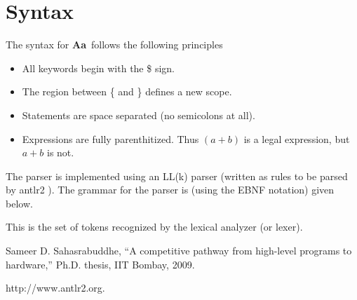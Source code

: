 \documentclass{article}
\newcommand{\Aa}{{\bf Aa}~}
\begin{document}
\section{Syntax} \label{sec:Syntax}

The syntax for \Aa follows the following
principles
\begin{itemize}
\item All keywords begin with the \$ sign.
\item The region between \{ and \} defines a new scope.
\item Statements are space separated (no semicolons at all).
\item Expressions are fully parenthitized.  Thus
$(a + b)$ is a legal expression, but $a+b$ is not.
\end{itemize}


The parser is implemented using 
an LL(k) parser (written as rules to be parsed by antlr2 \cite{ref:antlr2}).
The grammar for the parser is (using the EBNF notation) given below. 


This is the set of tokens recognized by the lexical analyzer (or lexer).


\begin{thebibliography}{99}
Sameer D. Sahasrabuddhe,
``A competitive pathway from high-level programs to hardware,''
Ph.D. thesis, IIT Bombay, 2009.

http://www.antlr2.org.
\end{thebibliography}
\end{document}
